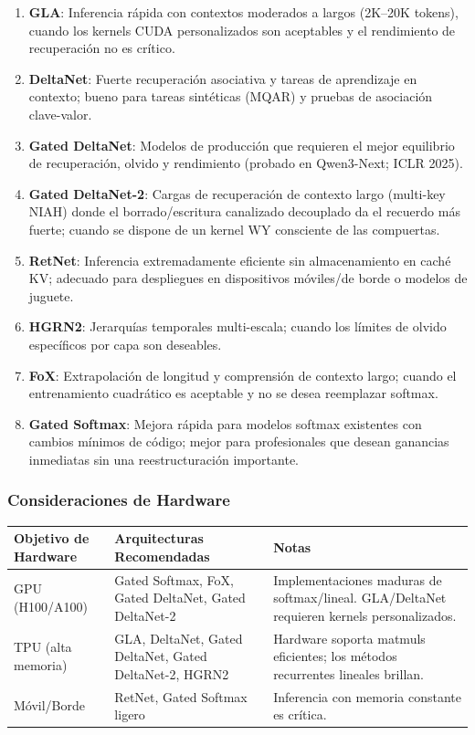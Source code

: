 \documentclass[11pt,a4paper]{article}
\begin{document}
\begin{enumerate}[leftmargin=*]
    \item \textbf{GLA}: Inferencia rápida con contextos moderados a largos (2K--20K tokens), cuando los kernels CUDA personalizados son aceptables y el rendimiento de recuperación no es crítico.
    \item \textbf{DeltaNet}: Fuerte recuperación asociativa y tareas de aprendizaje en contexto; bueno para tareas sintéticas (MQAR) y pruebas de asociación clave-valor.
    \item \textbf{Gated DeltaNet}: Modelos de producción que requieren el mejor equilibrio de recuperación, olvido y rendimiento (probado en Qwen3-Next; ICLR 2025).
    \item \textbf{Gated DeltaNet-2}: Cargas de recuperación de contexto largo (multi-key NIAH) donde el borrado/escritura canalizado decouplado da el recuerdo más fuerte; cuando se dispone de un kernel WY consciente de las compuertas.
    \item \textbf{RetNet}: Inferencia extremadamente eficiente sin almacenamiento en caché KV; adecuado para despliegues en dispositivos móviles/de borde o modelos de juguete.
    \item \textbf{HGRN2}: Jerarquías temporales multi-escala; cuando los límites de olvido específicos por capa son deseables.
    \item \textbf{FoX}: Extrapolación de longitud y comprensión de contexto largo; cuando el entrenamiento cuadrático es aceptable y no se desea reemplazar softmax.
    \item \textbf{Gated Softmax}: Mejora rápida para modelos softmax existentes con cambios mínimos de código; mejor para profesionales que desean ganancias inmediatas sin una reestructuración importante.
\end{enumerate}

\subsubsection{Consideraciones de Hardware}

\begin{table}[H]
\centering
\small
\begin{tabularx}{0.95\linewidth}{Xp{3.5cm}p{3.5cm}}
\toprule
\textbf{Objetivo de Hardware} & \textbf{Arquitecturas Recomendadas} & \textbf{Notas} \\
\midrule
GPU (H100/A100) & Gated Softmax, FoX, Gated DeltaNet, Gated DeltaNet-2 & Implementaciones maduras de softmax/lineal. GLA/DeltaNet requieren kernels personalizados. \\
TPU (alta memoria) & GLA, DeltaNet, Gated DeltaNet, Gated DeltaNet-2, HGRN2 & Hardware soporta matmuls eficientes; los métodos recurrentes lineales brillan. \\
Móvil/Borde & RetNet, Gated Softmax ligero & Inferencia con memoria constante es crítica. \\
\bottomrule
\end{tabularx}
\end{table}
\end{document}
